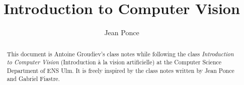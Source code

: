 \documentclass[toc, titlepaged]{../cs-classes/cs-classes}
\title{Introduction to Computer Vision}
\author{Jean Ponce}
\begin{document}
\begin{abstract}
    This document is Antoine Groudiev's class notes while following the class \emph{Introduction to Computer Vision} (Introduction à la vision artificielle) at the Computer Science Department of ENS Ulm. It is freely inspired by the class notes written by Jean Ponce and Gabriel Fiastre.
\end{abstract}












\end{document}
